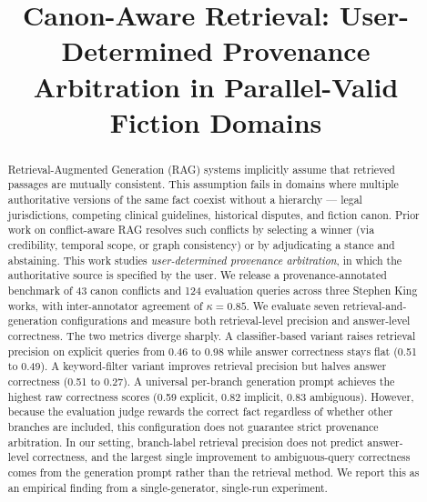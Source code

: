 \documentclass[conference]{IEEEtran}
\begin{document}
\title{Canon-Aware Retrieval: User-Determined Provenance Arbitration in Parallel-Valid Fiction Domains}

\author{
}

\maketitle


\begin{abstract}
Retrieval-Augmented Generation (RAG) systems implicitly assume that retrieved passages are mutually consistent. This assumption fails in domains where multiple authoritative versions of the same fact coexist without a hierarchy --- legal jurisdictions, competing clinical guidelines, historical disputes, and fiction canon. Prior work on conflict-aware RAG resolves such conflicts by selecting a winner (via credibility, temporal scope, or graph consistency) or by adjudicating a stance and abstaining. This work studies \emph{user-determined provenance arbitration}, in which the authoritative source is specified by the user. We release a provenance-annotated benchmark of 43 canon conflicts and 124 evaluation queries across three Stephen King works, with inter-annotator agreement of $\kappa = 0.85$. We evaluate seven retrieval-and-generation configurations and measure both retrieval-level precision and answer-level correctness. The two metrics diverge sharply. A classifier-based variant raises retrieval precision on explicit queries from 0.46 to 0.98 while answer correctness stays flat (0.51 to 0.49). A keyword-filter variant improves retrieval precision but halves answer correctness (0.51 to 0.27). A universal per-branch generation prompt achieves the highest raw correctness scores (0.59 explicit, 0.82 implicit, 0.83 ambiguous). However, because the evaluation judge rewards the correct fact regardless of whether other branches are included, this configuration does not guarantee strict provenance arbitration. In our setting, branch-label retrieval precision does not predict answer-level correctness, and the largest single improvement to ambiguous-query correctness comes from the generation prompt rather than the retrieval method. We report this as an empirical finding from a single-generator, single-run experiment.
\end{abstract}
\end{document}
